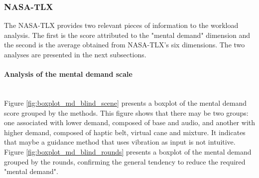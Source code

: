 \subsubsection{NASA-TLX}
\label{subsubsec:results_nasa_tlx_1}

The NASA-TLX provides two relevant pieces of information to the workload analysis. The first is the score attributed to the "mental demand" dimension and the second is the average obtained from NASA-TLX's six dimensions. The two analyses are presented in the next subsections.

\paragraph*{Analysis of the mental demand scale}\mbox{}\\


Figure \ref{fig:boxplot_md_blind_scene}  presents a boxplot of the mental demand score grouped by the methods. This figure shows that there may be two groups: one associated with lower demand, composed of base and audio, and another with higher demand, composed of haptic belt, virtual cane and mixture. It indicates that maybe a guidance method that uses vibration as input is not intuitive. Figure \ref{fig:boxplot_md_blind_rounds} presents a boxplot of the mental demand grouped by the rounds, confirming the general tendency to reduce the required "mental demand". 

